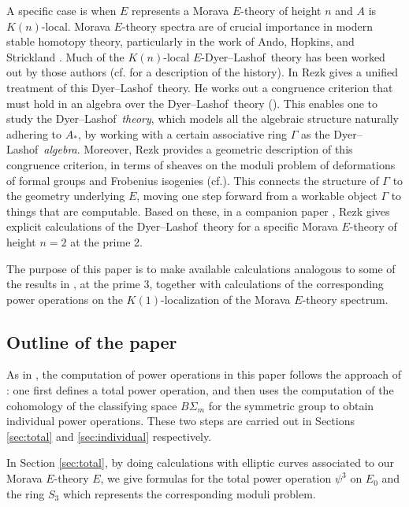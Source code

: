 \documentclass{gtpart}
\theoremstyle{definition}
\theoremstyle{remark}
\newcommand{\cf}{cf.\thinspace}
\newcommand{\DL}{Dyer--Lashof~}
\newcommand{\G}{\Gamma}
\newcommand{\p}{\psi^3}
\begin{document}
A specific case is when $E$ represents a Morava $E$-theory of height $n$ and $A$ is $K(n)$-local.  
Morava $E$-theory spectra are of crucial importance in modern stable homotopy theory, 
particularly in the work of Ando, Hopkins, and Strickland \cite{cube}.  
Much of the $K(n)$-local $E$-\DL theory has been worked out by those authors (\cf \cite[1.5]{cong} for a description of the history).  
In \cite{cong} Rezk gives a unified treatment of this \DL theory.  
He works out a congruence criterion that must hold in an algebra over the \DL theory (\cite[Theorem A]{cong}).  
This enables one to study the \DL {\em theory}, which models all the algebraic structure naturally adhering to $A_*$, 
by working with a certain associative ring $\G$ as the \DL {\em algebra}.  
Moreover, Rezk provides a geometric description of this congruence criterion, 
in terms of sheaves on the moduli problem of deformations of formal groups and Frobenius isogenies (\cf \cite[Theorem B]{cong}).  
This connects the structure of $\G$ to the geometry underlying $E$, 
moving one step forward from a workable object $\G$ to things that are computable.  
Based on these, in a companion paper \cite{h2p2}, 
Rezk gives explicit calculations of the \DL theory for a specific Morava $E$-theory of height $n = 2$ at the prime 2.  

The purpose of this paper is to make available calculations analogous to some of the results in \cite{h2p2}, at the prime 3, 
together with calculations of the corresponding power operations on the $K(1)$-localization of the Morava $E$-theory spectrum.  


\subsection{Outline of the paper}

As in \cite{h2p2}, the computation of power operations in this paper follows the approach of \cite{steenrod}: 
one first defines a total power operation, 
and then uses the computation of the cohomology of the classifying space $B\Sigma_m$ for the symmetric group to obtain individual power operations.  
These two steps are carried out in Sections \ref{sec:total} and \ref{sec:individual} respectively.  

In Section \ref{sec:total}, by doing calculations with elliptic curves associated to our Morava $E$-theory $E$, 
we give formulas for the total power operation $\p$ on $E_0$ and the ring $S_3$ which represents the corresponding moduli problem.  
\end{document}
